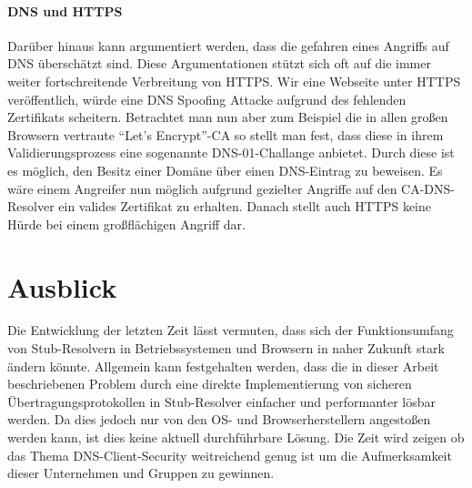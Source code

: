 \paragraph{DNS und HTTPS}
Darüber hinaus kann argumentiert werden, dass die gefahren eines Angriffs auf DNS überschätzt sind. Diese Argumentationen stützt sich oft auf die immer weiter fortschreitende Verbreitung von HTTPS. Wir eine Webseite unter HTTPS veröffentlich, würde eine DNS Spoofing Attacke aufgrund des fehlenden Zertifikats scheitern. Betrachtet man nun aber zum Beispiel die in allen großen Browsern vertraute ``Let's Encrypt''-CA so stellt man fest, dass diese in ihrem Validierungsprozess eine sogenannte DNS-01-Challange anbietet. Durch diese ist es möglich, den Besitz einer Domäne über einen DNS-Eintrag zu beweisen. Es wäre einem Angreifer nun möglich aufgrund gezielter Angriffe auf den CA-DNS-Resolver ein valides Zertifikat zu erhalten. Danach stellt auch HTTPS keine Hürde bei einem großflächigen Angriff dar.

\section{Ausblick}
Die Entwicklung der letzten Zeit lässt vermuten, dass sich der Funktionsumfang von Stub-Resolvern in Betriebssystemen\cite{Wallen2018} und Browsern\cite{McManus2018a} in naher Zukunft stark ändern könnte. Allgemein kann festgehalten werden, dass die in dieser Arbeit beschriebenen Problem durch eine direkte Implementierung von sicheren Übertragungsprotokollen in Stub-Resolver einfacher und performanter lösbar werden. Da dies jedoch nur von den \ac{OS}- und Browserherstellern angestoßen werden kann, ist dies keine aktuell durchführbare Lösung. Die Zeit wird zeigen ob das Thema DNS-Client-Security weitreichend genug ist um die Aufmerksamkeit dieser Unternehmen und Gruppen zu gewinnen.  

